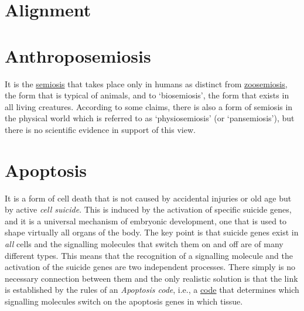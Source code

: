 \documentclass[12pt]{article}
\begin{document}
\hypertarget{alignment}{}
\section{Alignment}
 
\hypertarget{anthroposemiosis}{}
\section{Anthroposemiosis }
It is the \hyperlink{semiosis}{semiosis} that takes place only in humans as distinct from \hyperlink{zoosemiotics}{zoosemiosis}, the form that is typical of animals, and to `biosemiosis', the form that exists in all living creatures. According to some claims, there is also a form of semiosis in the physical world which is referred to as `physiosemiosis' (or `pansemiosis'), but there is no scientific evidence in support of this view.


\hypertarget{apoptosis}{}
\section{Apoptosis}
It is a form of cell death that is not caused by accidental injuries or old age but by active \textit{cell suicide}. This is induced by the activation of specific suicide genes, and it is a universal mechanism of embryonic development, one that is used to shape virtually all organs of the body. The key point is that suicide genes exist in \textit{all} cells and the signalling molecules that switch them on and off are of many different types. This means that the recognition of a signalling molecule and the activation of the suicide genes are two independent processes. There simply is no necessary connection between them and the only realistic solution is that the link is established by the rules of an \textit{Apoptosis code}, i.e., a \hyperlink{code}{code} that determines which signalling molecules switch on the apoptosis genes in which tissue.


\hypertarget{arbitrariness}{}
\end{document}
